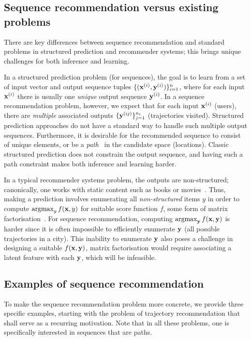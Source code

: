 \subsection{Sequence recommendation versus existing problems}

There are key differences between sequence recommendation and %
standard problems in structured prediction and recommender systems;
this brings unique challenges for both inference and learning.

In a structured prediction problem (for sequences), the goal is to learn from a set of
input vector and output sequence tuples
$\{ (\mathbf{x}^{({i})}, \mathbf{y}^{({i})}) \}_{i = 1}^n$, where
for each input $\mathbf{x}^{({i})}$ there is usually one \emph{unique} output sequence $\mathbf{y}^{({i})}$.
In a sequence recommendation problem, however, we expect that %
for each input $\mathbf{x}^{({i})}$ (\eg users),
there are \emph{multiple} associated outputs
$\{ \mathbf{y}^{({ij})} \}_{j=1}^{n_i}$ (\eg trajectories visited).
Structured prediction approaches do not have a standard way to handle such multiple output sequences.
Furthermore, it is desirable for the recommended sequence to consist of unique elements,
or be a {\em path}~\cite{west2001introduction} in the candidate space (\eg locations).
Classic structured prediction does not constrain the output sequence, and having such a
path constraint makes both inference and learning harder.

In a typical recommender systems problem, the outputs are non-structured; canonically, one works with {static} content such as books or movies~\citep{Goldberg:1992,Sarwar:2001,Netflix}.
Thus, making a prediction involves enumerating all {\em non-structured} items $y$ in order to compute $\operatorname*{argmax}_y f(\mathbf{x},y)$ for suitable score function $f$, \eg some form of matrix factorisation~\citep{Koren:2009}.
For sequence recommendation, computing $\operatorname*{argmax}_{\mathbf{y}} f(\mathbf{x},\mathbf{y})$ is harder since it is often impossible to efficiently enumerate $\mathbf{y}$ (\eg all possible trajectories in a city).
This inability to enumerate $\mathbf{y}$ also poses a challenge in designing a suitable $f(\mathbf{x},\mathbf{y})$,
\eg
matrix factorisation
would require associating a latent feature with each $\mathbf{y}$, which will be infeasible.


\subsection{Examples of sequence recommendation}
\label{sec:trajrec}

To make the sequence recommendation problem more concrete,
we provide three specific examples,
starting with the problem of trajectory recommendation
that shall serve as a recurring motivation.
Note that in all these problems, one is specifically interested in sequences that are paths.


